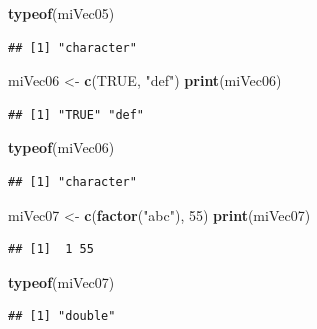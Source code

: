 \documentclass[]{book}
\newenvironment{Shaded}{\begin{snugshade}}{\end{snugshade}}
\newcommand{\DecValTok}[1]{\textcolor[rgb]{0.00,0.00,0.81}{#1}}
\newcommand{\KeywordTok}[1]{\textcolor[rgb]{0.13,0.29,0.53}{\textbf{#1}}}
\newcommand{\NormalTok}[1]{#1}
\newcommand{\OtherTok}[1]{\textcolor[rgb]{0.56,0.35,0.01}{#1}}
\newcommand{\StringTok}[1]{\textcolor[rgb]{0.31,0.60,0.02}{#1}}
\begin{document}
\begin{Shaded}
\begin{Highlighting}[]
\KeywordTok{typeof}\NormalTok{(miVec05)}
\end{Highlighting}
\end{Shaded}

\begin{verbatim}
## [1] "character"
\end{verbatim}

\begin{Shaded}
\begin{Highlighting}[]
\NormalTok{miVec06 <-}\StringTok{ }\KeywordTok{c}\NormalTok{(}\OtherTok{TRUE}\NormalTok{, }\StringTok{"def"}\NormalTok{)}
\KeywordTok{print}\NormalTok{(miVec06)}
\end{Highlighting}
\end{Shaded}

\begin{verbatim}
## [1] "TRUE" "def"
\end{verbatim}

\begin{Shaded}
\begin{Highlighting}[]
\KeywordTok{typeof}\NormalTok{(miVec06)}
\end{Highlighting}
\end{Shaded}

\begin{verbatim}
## [1] "character"
\end{verbatim}

\begin{Shaded}
\begin{Highlighting}[]
\NormalTok{miVec07 <-}\StringTok{ }\KeywordTok{c}\NormalTok{(}\KeywordTok{factor}\NormalTok{(}\StringTok{"abc"}\NormalTok{), }\DecValTok{55}\NormalTok{)}
\KeywordTok{print}\NormalTok{(miVec07)}
\end{Highlighting}
\end{Shaded}

\begin{verbatim}
## [1]  1 55
\end{verbatim}

\begin{Shaded}
\begin{Highlighting}[]
\KeywordTok{typeof}\NormalTok{(miVec07)}
\end{Highlighting}
\end{Shaded}

\begin{verbatim}
## [1] "double"
\end{verbatim}
\end{document}
